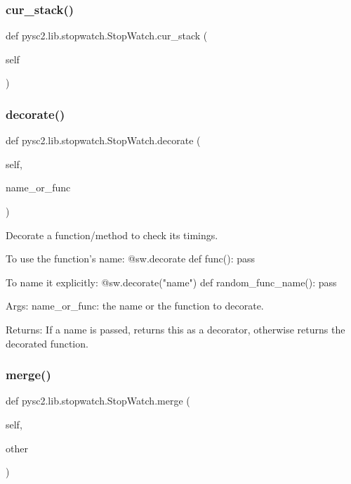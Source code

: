 \subsubsection{\texorpdfstring{cur\+\_\+stack()}{cur\_stack()}}
{\footnotesize\ttfamily def pysc2.\+lib.\+stopwatch.\+Stop\+Watch.\+cur\+\_\+stack (\begin{DoxyParamCaption}\item[{}]{self }\end{DoxyParamCaption})}

\mbox{\label{classpysc2_1_1lib_1_1stopwatch_1_1_stop_watch_a506109bfd7df110925425466a59c0c13}} 
\subsubsection{\texorpdfstring{decorate()}{decorate()}}
{\footnotesize\ttfamily def pysc2.\+lib.\+stopwatch.\+Stop\+Watch.\+decorate (\begin{DoxyParamCaption}\item[{}]{self,  }\item[{}]{name\+\_\+or\+\_\+func }\end{DoxyParamCaption})}

\begin{DoxyVerb}Decorate a function/method to check its timings.

To use the function's name:
  @sw.decorate
  def func():
pass

To name it explicitly:
  @sw.decorate("name")
  def random_func_name():
pass

Args:
  name_or_func: the name or the function to decorate.

Returns:
  If a name is passed, returns this as a decorator, otherwise returns the
  decorated function.
\end{DoxyVerb}
 \mbox{\label{classpysc2_1_1lib_1_1stopwatch_1_1_stop_watch_a59d7e0986c4de0c33aa63c027e109a47}} 
\subsubsection{\texorpdfstring{merge()}{merge()}}
{\footnotesize\ttfamily def pysc2.\+lib.\+stopwatch.\+Stop\+Watch.\+merge (\begin{DoxyParamCaption}\item[{}]{self,  }\item[{}]{other }\end{DoxyParamCaption})}

